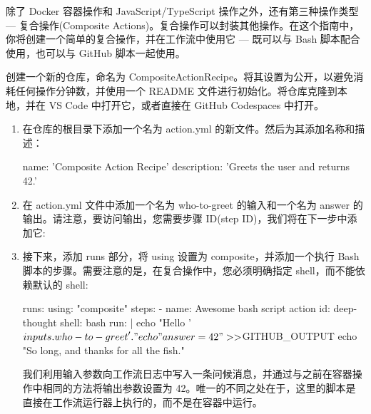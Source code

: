 
除了 Docker 容器操作和 JavaScript/TypeScript 操作之外，还有第三种操作类型 --- 复合操作(Composite Actions)。复合操作可以封装其他操作。在这个指南中，你将创建一个简单的复合操作，并在工作流中使用它 --- 既可以与 Bash 脚本配合使用，也可以与 GitHub 脚本一起使用。


创建一个新的仓库，命名为 CompositeActionRecipe。将其设置为公开，以避免消耗任何操作分钟数，并使用一个 README 文件进行初始化。将仓库克隆到本地，并在 VS Code 中打开它，或者直接在 GitHub Codespaces 中打开。


\begin{enumerate}
\item 
在仓库的根目录下添加一个名为 action.yml 的新文件。然后为其添加名称和描述：

\begin{shell}
name: 'Composite Action Recipe'
description: 'Greets the user and returns 42.'
\end{shell}

\item 
在 action.yml 文件中添加一个名为 who-to-greet 的输入和一个名为 answer 的输出。请注意，要访问输出，您需要步骤 ID(step ID)，我们将在下一步中添加它:


\item 
接下来，添加 runs 部分，将 using 设置为 composite，并添加一个执行 Bash 脚本的步骤。需要注意的是，在复合操作中，您必须明确指定 shell，而不能依赖默认的 shell:

\begin{shell}
runs:
  using: "composite"
  steps:
    - name: Awesome bash script action
      id: deep-thought
      shell: bash
      run: |
        echo "Hello '${{ inputs.who-to-greet }}'."
        echo "answer=42" >> $GITHUB_OUTPUT
        echo "So long, and thanks for all the fish."
\end{shell}

我们利用输入参数向工作流日志中写入一条问候消息，并通过与之前在容器操作中相同的方法将输出参数设置为 42。唯一的不同之处在于，这里的脚本是直接在工作流运行器上执行的，而不是在容器中运行。


\end{enumerate}
